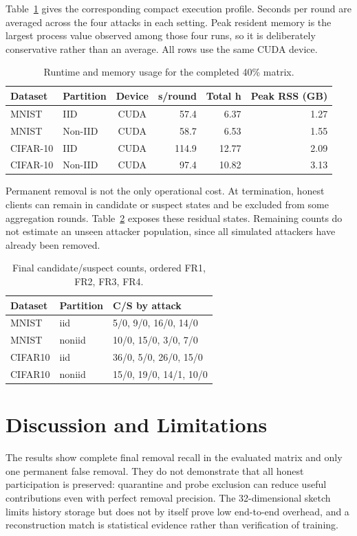 \documentclass[conference]{IEEEtran}
\begin{document}
Table~\ref{tab:cost} gives the corresponding compact execution profile. Seconds per round are averaged across the four attacks in each setting. Peak resident memory is the largest process value observed among those four runs, so it is deliberately conservative rather than an average. All rows use the same CUDA device.

\begin{table}[t]
\centering
\caption{Runtime and memory usage for the completed 40\% matrix.}
\label{tab:cost}
\footnotesize
\setlength{\tabcolsep}{3pt}
\begin{tabular}{llcrrr}
\toprule
Dataset & Partition & Device & s/round & Total h & Peak RSS (GB)\\
\midrule
MNIST & IID & CUDA & 57.4 & 6.37 & 1.27\\
MNIST & Non-IID & CUDA & 58.7 & 6.53 & 1.55\\
CIFAR-10 & IID & CUDA & 114.9 & 12.77 & 2.09\\
CIFAR-10 & Non-IID & CUDA & 97.4 & 10.82 & 3.13\\
\bottomrule
\end{tabular}
\end{table}

Permanent removal is not the only operational cost. At termination, honest clients can remain in candidate or suspect states and be excluded from some aggregation rounds. Table~\ref{tab:states} exposes these residual states. Remaining counts do not estimate an unseen attacker population, since all simulated attackers have already been removed.
\begin{table}[t]\centering\small
\caption{Final candidate/suspect counts, ordered FR1, FR2, FR3, FR4.}\label{tab:states}
\begin{tabular}{lll}\toprule Dataset & Partition & C/S by attack\\\midrule
MNIST & iid & 5/0, 9/0, 16/0, 14/0\\
MNIST & noniid & 10/0, 15/0, 3/0, 7/0\\
CIFAR10 & iid & 36/0, 5/0, 26/0, 15/0\\
CIFAR10 & noniid & 15/0, 19/0, 14/1, 10/0\\

\bottomrule\end{tabular}\end{table}
\section{Discussion and Limitations}
The results show complete final removal recall in the evaluated matrix and only one permanent false removal. They do not demonstrate that all honest participation is preserved: quarantine and probe exclusion can reduce useful contributions even with perfect removal precision. The 32-dimensional sketch limits history storage but does not by itself prove low end-to-end overhead, and a reconstruction match is statistical evidence rather than verification of training.
\end{document}
